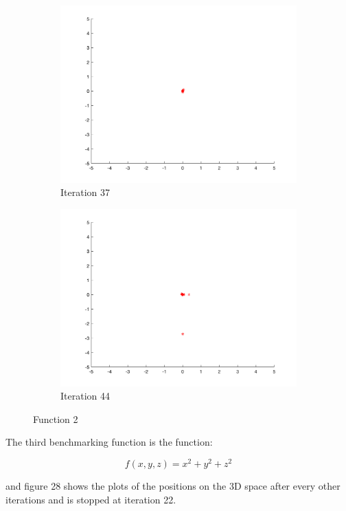 \begin{figure}
\begin{subfigure}[b]{0.4\textwidth}
    \includegraphics[width=\textwidth]{img/smpl/sphr/loa-iter-37}
    \caption{Iteration 37}
    \label{fig:s2-iter-6}
  \end{subfigure}
  \begin{subfigure}[b]{0.4\textwidth}
    \includegraphics[width=\textwidth]{img/smpl/sphr/loa-iter-44}
    \caption{Iteration 44}
    \label{fig:s2-iter-7}
  \end{subfigure}
  \caption{Function 2}
\end{figure}


The third benchmarking function is the function:

$$
  f(x, y, z) = x^2 + y^2 + z^2
$$

and figure 28 shows the plots of the positions on the 3D space after every other iterations and is stopped at iteration 22.

